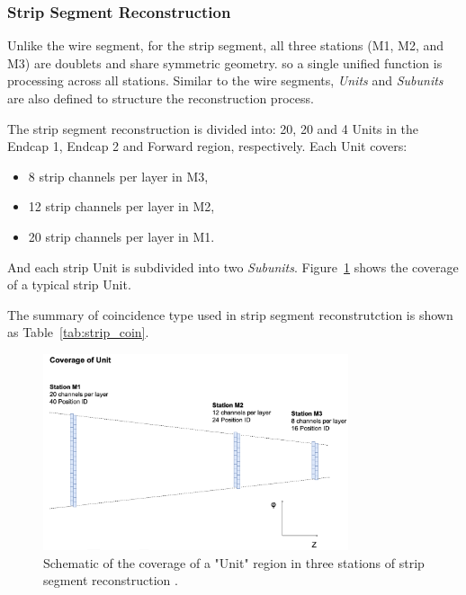 \subsubsection{Strip Segment Reconstruction}

Unlike the wire segment, for the strip segment, all three stations (M1, M2, and M3) are doublets and share symmetric geometry. so a single unified function is processing across all stations. Similar to the wire segments, \textit{Units} and \textit{Subunits} are also defined to structure the reconstruction process.

The strip segment reconstruction is divided into: 20, 20 and 4 Units in the Endcap 1, Endcap 2 and Forward region, respectively. Each Unit covers:
\begin{itemize}
  \item 8 strip channels per layer in M3,
  \item 12 strip channels per layer in M2,
  \item 20 strip channels per layer in M1.
\end{itemize}
And each strip Unit is subdivided into two \textit{Subunits}. Figure~\ref{fig:strip_unit} shows the coverage of a typical strip Unit.

The summary of coincidence type used in strip segment reconstrutction is shown as Table~\ref{tab:strip_coin}.


\begin{figure}[htbp]
  \centering
  \includegraphics[width=0.8\textwidth]{figs/chapter5/strip_unit.png}
  \caption{Schematic of the coverage of a "Unit" region in three stations of strip segment reconstruction \cite{EndcapSLPDR}.}
  \label{fig:strip_unit}
\end{figure}

